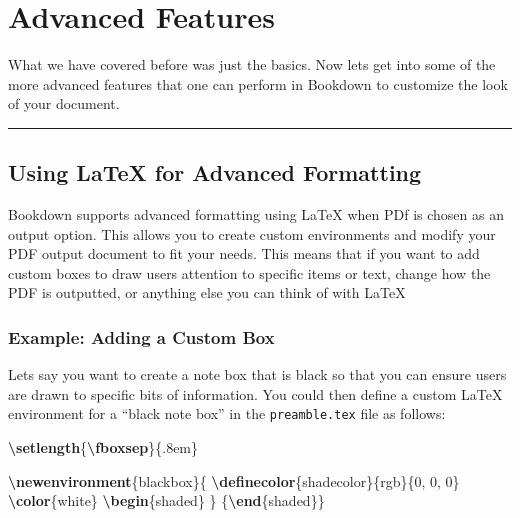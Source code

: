 \documentclass[
]{book}
\newenvironment{Shaded}{\begin{snugshade}}{\end{snugshade}}
\newcommand{\ExtensionTok}[1]{#1}
\newcommand{\FunctionTok}[1]{\textcolor[rgb]{0.13,0.29,0.53}{\textbf{#1}}}
\newcommand{\KeywordTok}[1]{\textcolor[rgb]{0.13,0.29,0.53}{\textbf{#1}}}
\newcommand{\NormalTok}[1]{#1}
\theoremstyle{definition}
\theoremstyle{definition}
\theoremstyle{definition}
\theoremstyle{definition}
\theoremstyle{remark}
\begin{document}
\chapter{Advanced Features}\label{chapter6}

What we have covered before was just the basics. Now lets get into some of the more advanced features that one can perform in Bookdown to customize the look of your document.

\begin{center}\rule{0.5\linewidth}{0.5pt}\end{center}

\section{Using LaTeX for Advanced Formatting}\label{using-latex-for-advanced-formatting}

Bookdown supports advanced formatting using LaTeX when PDf is chosen as an output option. This allows you to create custom environments and modify your PDF output document to fit your needs. This means that if you want to add custom boxes to draw users attention to specific items or text, change how the PDF is outputted, or anything else you can think of with LaTeX

\subsection{Example: Adding a Custom Box}\label{example-adding-a-custom-box}

Lets say you want to create a note box that is black so that you can ensure users are drawn to specific bits of information. You could then define a custom LaTeX environment for a ``black note box'' in the \texttt{preamble.tex} file as follows:

\begin{Shaded}
\begin{Highlighting}[]
\FunctionTok{\textbackslash{}setlength}\NormalTok{\{}\FunctionTok{\textbackslash{}fboxsep}\NormalTok{\}\{.8em\}}

\FunctionTok{\textbackslash{}newenvironment}\NormalTok{\{blackbox\}\{}
  \FunctionTok{\textbackslash{}definecolor}\NormalTok{\{shadecolor\}\{rgb\}\{0, 0, 0\}}
  \FunctionTok{\textbackslash{}color}\NormalTok{\{white\}}
  \KeywordTok{\textbackslash{}begin}\NormalTok{\{}\ExtensionTok{shaded}\NormalTok{\}}
\NormalTok{  \}}
\NormalTok{ \{}\KeywordTok{\textbackslash{}end}\NormalTok{\{}\ExtensionTok{shaded}\NormalTok{\}\}}
\end{Highlighting}
\end{Shaded}
\end{document}
